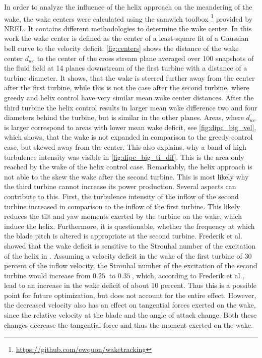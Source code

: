 In order to analyze the influence of the helix approach on the meandering of the wake, the wake centers were calculated using the samwich toolbox \footnote{\url{https://github.com/ewquon/waketracking}} provided by NREL. It contains different methodologies to determine the wake center. In this work the wake center is defined as the center of a least-square fit of a Gaussian bell curve to the velocity deficit. \autoref{fig:centers} shows the distance of the wake center $d_{wc}$ to the center of the cross stream plane averaged over 100 snapshots of the fluid field at 14 planes downstream of the first turbine with a distance of a turbine diameter. It shows, that the wake is steered further away from the center after the first turbine, while this is not the case after the second turbine, where greedy and helix control have very similar mean wake center distances. After the third turbine the helix control results in larger mean wake difference two and four diameters behind the turbine, but is similar in the other planes. Areas, where $\overline{d_{wc}}$ is larger correspond to areas with lower mean wake deficit, see \autoref{fig:dipc_big_vel}, which shows, that the wake is not expanded in comparison to the greedy-control case, but skewed away from the center. This also explains, why a band of high turbulence intensity was visible in \autoref{fig:dipc_big_ti_dif}. This is the area only reached by the wake of the helix control case. Remarkably, the helix approach is not able to the skew the wake after the second turbine. This is most likely why the third turbine cannot increase its power production. Several aspects can contribute to this. First, the turbulence intensity  of the inflow of the second turbine increased in comparison to the inflow of the first turbine. This likely reduces the tilt and yaw moments exerted by the turbine on the wake, which induce the helix. Furthermore, it is questionable, whether the frequency at which the blade pitch is altered is appropriate at the second turbine. Frederik et al. showed that the wake deficit is sensitive to the Strouhal number of the excitation of the helix in \cite{frederik_helix_2020}. Assuming a velocity deficit in the wake of the first turbine of $\SI{30}{}$ percent of the inflow velocity, the Strouhal number of the excitation of the second turbine would increase from $\SI{0.25}{}$ to $\SI{0.35}{}$, which, according to Frederik et al., lead to an increase in the wake deficit of about $10$ percent. Thus this is a possible point for future optimization, but does not account for the entire effect. However, the decreased velocity also has an effect on tangential forces exerted on the wake, since the relative velocity at the blade and the angle of attack change. Both these changes decrease the tangential force and thus the moment exerted on the wake. \\
